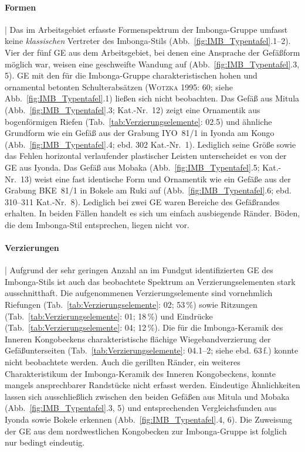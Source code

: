 \paragraph{Formen}\hspace{-.5em}|\hspace{.5em}%
Das im Arbeitsgebiet erfasste Formenspektrum der Imbonga-Gruppe umfasst keine \textit{klassischen} Vertreter des Imbonga-Stils (Abb.~\ref{fig:IMB_Typentafel}.1--2). Vier der fünf GE aus dem Arbeitsgebiet, bei denen eine Ansprache der Gefäßform möglich war, weisen eine geschweifte Wandung auf (Abb.~\ref{fig:IMB_Typentafel}.3, 5). GE mit den für die Imbonga-Gruppe charakteristischen hohen und ornamental betonten Schulterabsätzen (\textsc{Wotzka} 1995: 60; siehe Abb.~\ref{fig:IMB_Typentafel}.1) ließen sich nicht beobachten. Das Gefäß aus Mitula (Abb.~\ref{fig:IMB_Typentafel}.3; Kat.-Nr.~12) zeigt eine Ornamentik aus bogenförmigen Riefen (Tab.~\ref{tab:Verzierungselemente}: 02.5) und ähnliche Grundform wie ein Gefäß aus der Grabung IYO~81/1 in Iyonda am Kongo (Abb.~\ref{fig:IMB_Typentafel}.4; ebd. 302 Kat.-Nr.~1). Lediglich seine Größe sowie das Fehlen horizontal verlaufender plastischer Leisten unterscheidet es von der GE aus Iyonda. Das Gefäß aus Mobaka (Abb.~\ref{fig:IMB_Typentafel}.5; Kat.-Nr.~13) weist eine fast identische Form und Ornamentik wie ein Gefäße aus der Grabung BKE~81/1 in Bokele am Ruki auf (Abb.~\ref{fig:IMB_Typentafel}.6; ebd. 310--311 Kat.-Nr.~8). Lediglich bei zwei GE waren Bereiche des Gefäßrandes erhalten. In beiden Fällen handelt es sich um einfach ausbiegende Ränder. Böden, die dem Imbonga-Stil entsprechen, liegen nicht vor. 


\paragraph{Verzierungen}\hspace{-.5em}|\hspace{.5em}%
Aufgrund der sehr geringen Anzahl an im Fundgut identifizierten GE des Imbonga-Stils ist auch das beobachtete Spektrum an Verzierungselementen stark ausschnitthaft. Die aufgenommenen Verzierungselemente sind vornehmlich Riefungen (Tab.~\ref{tab:Verzierungselemente}: 02; 53\,\%) sowie Ritzungen (Tab.~\ref{tab:Verzierungselemente}: 01; 18\,\%) und Eindrücke (Tab.~\ref{tab:Verzierungselemente}: 04; 12\,\%). Die für die Imbonga-Keramik des Inneren Kongobeckens charakteristische flächige Wiegebandverzierung der Gefäßunterseiten (Tab.~\ref{tab:Verzierungselemente}: 04.1--2; siehe ebd. 63\,f.) konnte nicht beobachtete werden. Auch die gerillten Ränder, ein weiteres Charakteristikum der Imbonga-Keramik des Inneren Kongobeckens, konnte mangels ansprechbarer Randstücke nicht erfasst werden. Eindeutige Ähnlichkeiten lassen sich ausschließlich zwischen den beiden Gefäßen aus Mitula und Mobaka (Abb.~\ref{fig:IMB_Typentafel}.3, 5) und entsprechenden Vergleichsfunden aus Iyonda sowie Bokele erkennen (Abb.~\ref{fig:IMB_Typentafel}.4, 6). Die Zuweisung der GE aus dem nordwestlichen Kongobecken zur Imbonga-Gruppe ist folglich nur bedingt eindeutig.


